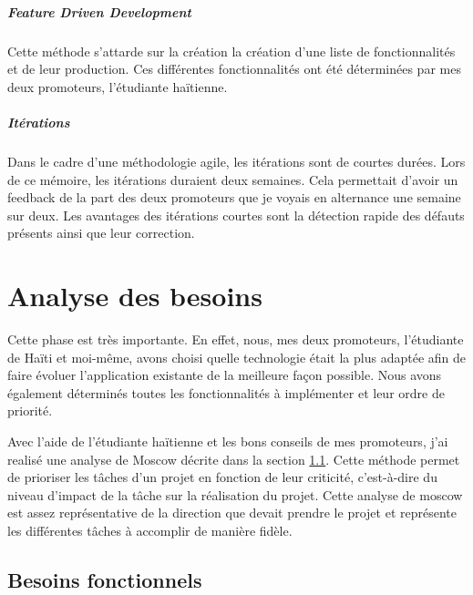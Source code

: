 \documentclass{EPL-master-thesis-covers-FR}
\begin{document}
				\paragraph*{Feature Driven Development} Cette méthode s'attarde sur la création la création d'une liste de fonctionnalités et de leur production. Ces différentes fonctionnalités ont été déterminées par mes deux promoteurs, l'étudiante haïtienne.
				
				\paragraph*{Itérations} Dans le cadre d'une méthodologie agile, les itérations sont de courtes durées. Lors de ce mémoire, les itérations duraient deux semaines. Cela permettait d'avoir un feedback de la part des deux promoteurs que je voyais en alternance une semaine sur deux. Les avantages des itérations courtes sont la détection rapide des défauts présents ainsi que leur correction. 
			
			

	\chapter{Analyse des besoins}
		\label{sec:analyse_besoins}
		Cette phase est très importante. En effet, nous, mes deux promoteurs, l'étudiante de Haïti et moi-même, avons choisi quelle technologie était la plus adaptée afin de faire évoluer l'application existante de la meilleure façon possible. Nous avons également déterminés toutes les fonctionnalités à implémenter et leur ordre de priorité.
		
		Avec l'aide de l'étudiante haïtienne et les bons conseils de mes promoteurs, j'ai realisé une analyse de Moscow décrite dans la section \ref{sec:besoins_fonctionnels}. Cette méthode permet de prioriser les tâches d'un projet en fonction de leur criticité, c'est-à-dire du niveau d'impact de la tâche sur la réalisation du projet.
		Cette analyse de \gls{moscow} est assez représentative de la direction que devait prendre le projet et représente les différentes tâches à accomplir de manière fidèle.


		\section{Besoins fonctionnels}
			\label{sec:besoins_fonctionnels}	
				
\end{document}
